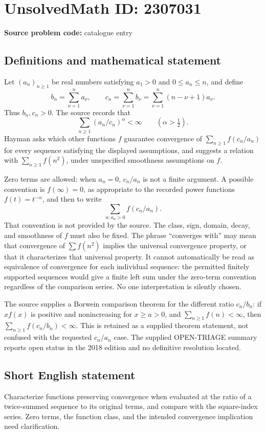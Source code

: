 \documentclass[11pt]{article}
\begin{document}
\section*{UnsolvedMath ID: 2307031}
\textbf{Source problem code:} catalogue entry
\subsection{Definitions and mathematical statement}
Let \((a_n)_{n\ge1}\) be real numbers satisfying \(a_1>0\) and \(0\le a_n\le n\), and define
\[
b_n=\sum_{\nu=1}^na_\nu,\qquad
c_n=\sum_{\nu=1}^nb_\nu=\sum_{\nu=1}^n(n-\nu+1)a_\nu.
\]
Thus \(b_n,c_n>0\). The source records that
\[
\sum_{n\ge1}(a_n/c_n)^\alpha<\infty\qquad(\alpha>\tfrac12).
\]
Hayman asks which other functions \(f\) guarantee convergence of \(\sum_{n\ge1}f(c_n/a_n)\) for every sequence satisfying the displayed assumptions, and suggests a relation with \(\sum_{n\ge1}f(n^2)\), under unspecified smoothness assumptions on \(f\).

Zero terms are allowed: when \(a_n=0\), \(c_n/a_n\) is not a finite argument. A possible convention is \(f(\infty)=0\), as appropriate to the recorded power functions \(f(t)=t^{-\alpha}\), and then to write
\[
\sum_{n:a_n>0}f(c_n/a_n).
\]
That convention is not provided by the source. The class, sign, domain, decay, and smoothness of \(f\) must also be fixed. The phrase ``converges with'' may mean that convergence of \(\sum f(n^2)\) implies the universal convergence property, or that it characterizes that universal property. It cannot automatically be read as equivalence of convergence for each individual sequence: the permitted finitely supported sequences would give a finite left sum under the zero-term convention regardless of the comparison series. No one interpretation is silently chosen.

The source supplies a Borwein comparison theorem for the different ratio \(c_n/b_n\): if \(xf(x)\) is positive and nonincreasing for \(x\ge a>0\), and \(\sum_{n\ge1}f(n)<\infty\), then \(\sum_{n\ge1}f(c_n/b_n)<\infty\). This is retained as a supplied theorem statement, not confused with the requested \(c_n/a_n\) case. The supplied OPEN-TRIAGE summary reports open status in the 2018 edition and no definitive resolution located.
\subsection{Short English statement}
Characterize functions preserving convergence when evaluated at the ratio of a twice-summed sequence to its original terms, and compare with the square-index series. Zero terms, the function class, and the intended convergence implication need clarification.
\end{document}
